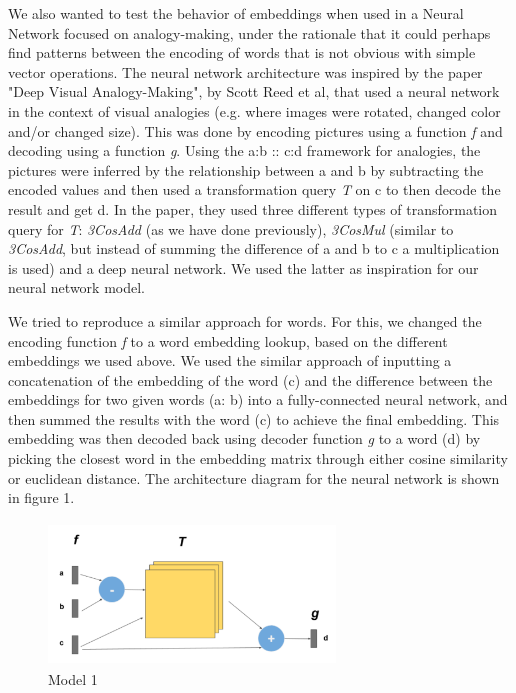 \documentclass[11pt]{article}
\begin{document}
We also wanted to test the behavior of embeddings when used in a Neural
Network focused on analogy-making, under the rationale that it could
perhaps find patterns between the encoding of words that is not obvious
with simple vector operations. The neural network architecture was
inspired by the paper "Deep Visual Analogy-Making", by Scott Reed et al,
that used a neural network in the context of visual analogies (e.g.
where images were rotated, changed color and/or changed size). This was
done by encoding pictures using a function \emph{f} and decoding using a
function \emph{g}. Using the a:b :: c:d framework for analogies, the
pictures were inferred by the relationship between a and b by
subtracting the encoded values and then used a transformation query
\emph{T} on c to then decode the result and get d. In the paper, they
used three different types of transformation query for \emph{T}:
\emph{3CosAdd} (as we have done previously), \emph{3CosMul} (similar to
\emph{3CosAdd}, but instead of summing the difference of a and b to c a
multiplication is used) and a deep neural network. We used the latter as
inspiration for our neural network model.

We tried to reproduce a similar approach for words. For this, we changed
the encoding function \emph{f} to a word embedding lookup, based on the
different embeddings we used above. We used the similar approach of
inputting a concatenation of the embedding of the word (c) and the
difference between the embeddings for two given words (a: b) into a
fully-connected neural network, and then summed the results with the
word (c) to achieve the final embedding. This embedding was then decoded
back using decoder function \emph{g }to a word (d) by picking the
closest word in the embedding matrix through either cosine similarity or
euclidean distance. The architecture diagram for the neural network is
shown in figure 1.

\begin{figure}
  \centering
\includegraphics[width=3.0in,height=1.5in]{./model_1.png}
  \caption{Model 1}
\end{figure}
\end{document}
